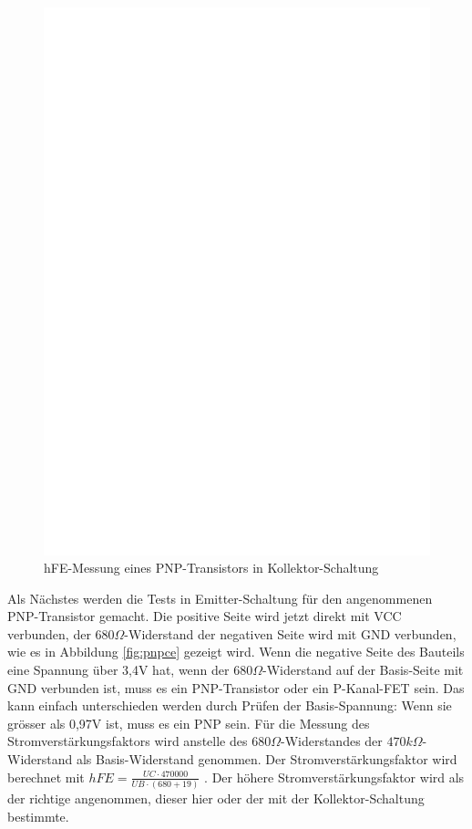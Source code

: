 \begin{figure}[H]
\centering
\includegraphics[]{../FIG/PNPcc.eps}
\caption{hFE-Messung eines PNP-Transistors in Kollektor-Schaltung}
\label{fig:pnpcc}
\end{figure}

Als N\"achstes werden die Tests in Emitter-Schaltung f\"ur den angenommenen PNP-Transistor gemacht.
Die positive Seite wird jetzt direkt mit VCC verbunden, der \(680\Omega\)-Widerstand der negativen Seite wird 
mit GND verbunden, wie es in Abbildung \ref{fig:pnpce} gezeigt wird. 
Wenn die negative Seite des Bauteils eine Spannung \"uber 3,4V hat, wenn der \(680\Omega\)-Widerstand auf der Basis-Seite mit
GND verbunden ist, muss es ein PNP-Transistor oder ein P-Kanal-FET sein.
Das kann einfach unterschieden werden durch Pr\"ufen der Basis-Spannung: Wenn sie gr\"osser als 0,97V ist, muss es ein PNP sein.
F\"ur die Messung des Stromverst\"arkungsfaktors wird anstelle des \(680\Omega\)-Widerstandes der
 \(470k\Omega\)-Widerstand als Basis-Widerstand genommen.
Der Stromverst\"arkungsfaktor wird berechnet mit \(hFE = \frac{UC \cdot 470000}{UB \cdot (680+19)}\) .
Der h\"ohere Stromverst\"arkungsfaktor wird als der richtige angenommen, dieser hier oder der
mit der Kollektor-Schaltung bestimmte.

